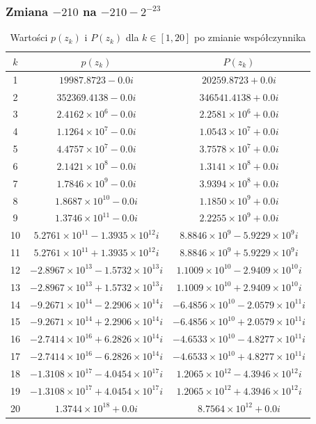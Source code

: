 \documentclass{article}
\begin{document}
\subsubsection*{Zmiana $-210$ na $-210-2^{-23}$}
\begin{table}[h]
  \centering
  \begin{tabular}{|c|c|c|}
    \hline
    $k$ & $p(z_k)$ & $P(z_k)$ \\
    \hline
    1 & $19987.8723 - 0.0i$ & $20259.8723 + 0.0i$ \\
    2 & $352369.4138 - 0.0i$ & $346541.4138 + 0.0i$ \\
    3 & $2.4162 \times 10^6 - 0.0i$ & $2.2581 \times 10^6 + 0.0i$ \\
    4 & $1.1264 \times 10^7 - 0.0i$ & $1.0543 \times 10^7 + 0.0i$ \\
    5 & $4.4757 \times 10^7 - 0.0i$ & $3.7578 \times 10^7 + 0.0i$ \\
    6 & $2.1421 \times 10^8 - 0.0i$ & $1.3141 \times 10^8 + 0.0i$ \\
    7 & $1.7846 \times 10^9 - 0.0i$ & $3.9394 \times 10^8 + 0.0i$ \\
    8 & $1.8687 \times 10^{10} - 0.0i$ & $1.1850 \times 10^9 + 0.0i$ \\
    9 & $1.3746 \times 10^{11} - 0.0i$ & $2.2255 \times 10^9 + 0.0i$ \\
    10 & $5.2761 \times 10^{11} - 1.3935 \times 10^{12}i$ & $8.8846 \times 10^9 - 5.9229 \times 10^9i$ \\
    11 & $5.2761 \times 10^{11} + 1.3935 \times 10^{12}i$ & $8.8846 \times 10^9 + 5.9229 \times 10^9i$ \\
    12 & $-2.8967 \times 10^{13} - 1.5732 \times 10^{13}i$ & $1.1009 \times 10^{10} - 2.9409 \times 10^{10}i$ \\
    13 & $-2.8967 \times 10^{13} + 1.5732 \times 10^{13}i$ & $1.1009 \times 10^{10} + 2.9409 \times 10^{10}i$ \\
    14 & $-9.2671 \times 10^{14} - 2.2906 \times 10^{14}i$ & $-6.4856 \times 10^{10} - 2.0579 \times 10^{11}i$ \\
    15 & $-9.2671 \times 10^{14} + 2.2906 \times 10^{14}i$ & $-6.4856 \times 10^{10} + 2.0579 \times 10^{11}i$ \\
    16 & $-2.7414 \times 10^{16} + 6.2826 \times 10^{14}i$ & $-4.6533 \times 10^{10} - 4.8277 \times 10^{11}i$ \\
    17 & $-2.7414 \times 10^{16} - 6.2826 \times 10^{14}i$ & $-4.6533 \times 10^{10} + 4.8277 \times 10^{11}i$ \\
    18 & $-1.3108 \times 10^{17} - 4.0454 \times 10^{17}i$ & $1.2065 \times 10^{12} - 4.3946 \times 10^{12}i$ \\
    19 & $-1.3108 \times 10^{17} + 4.0454 \times 10^{17}i$ & $1.2065 \times 10^{12} + 4.3946 \times 10^{12}i$ \\
    20 & $1.3744 \times 10^{18} + 0.0i$ & $8.7564 \times 10^{12} + 0.0i$ \\
    \hline
  \end{tabular}
  \caption{Wartości $p(z_k)$ i $P(z_k)$ dla $k \in [1,20]$ po zmianie współczynnika}
\end{table}
\end{document}
